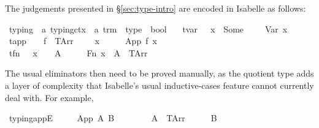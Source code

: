 The judgements presented in \S\ref{sec:type-intro} are encoded in Isabelle as follows:

\begin{implementation}
\isamarkupfalse%
\ typing\ {\isacharcolon}{\isacharcolon}\ {\isachardoublequoteopen}{\isacharprime}a\ typing{\isacharunderscore}ctx\ {\isasymRightarrow}\ {\isacharprime}a\ trm\ {\isasymRightarrow}\ type\ {\isasymRightarrow}\ bool{\isachardoublequoteclose}\  \isanewline
\ \ tvar{\isacharcolon}\ \ {\isachardoublequoteopen}{\isasymGamma}\ x\ {\isacharequal}\ Some\ {\isasymtau}\ {\isasymLongrightarrow}\ {\isasymGamma}\ {\isasymturnstile}\ Var\ x\ {\isacharcolon}\ {\isasymtau}{\isachardoublequoteclose}\isanewline
{\isacharbar}\ tapp{\isacharcolon}\ \ {\isachardoublequoteopen}{\isasymlbrakk}{\isasymGamma}\ {\isasymturnstile}\ f\ {\isacharcolon}\ {\isacharparenleft}TArr\ {\isasymtau}\ {\isasymsigma}{\isacharparenright}{\isacharsemicolon}\ {\isasymGamma}\ {\isasymturnstile}\ x\ {\isacharcolon}\ {\isasymtau}{\isasymrbrakk}\ {\isasymLongrightarrow}\ {\isasymGamma}\ {\isasymturnstile}\ App\ f\ x\ {\isacharcolon}\ {\isasymsigma}{\isachardoublequoteclose}\isanewline
{\isacharbar}\ tfn{\isacharcolon}\ \ \ {\isachardoublequoteopen}{\isasymGamma}{\isacharparenleft}x\ {\isasymmapsto}\ {\isasymtau}{\isacharparenright}\ {\isasymturnstile}\ A\ {\isacharcolon}\ {\isasymsigma}\ {\isasymLongrightarrow}\ {\isasymGamma}\ {\isasymturnstile}\ Fn\ x\ {\isasymtau}\ A\ {\isacharcolon}\ {\isacharparenleft}TArr\ {\isasymtau}\ {\isasymsigma}{\isacharparenright}{\isachardoublequoteclose}\isanewline
\end{implementation}

The usual eliminators then need to be proved manually, as the quotient type adds a layer of complexity that Isabelle's usual inductive-cases feature cannot currently deal with.
For example,

\begin{implementation}
\isamarkupfalse%
\ typing{\isacharunderscore}appE{\isacharcolon}\isanewline
\ \ \ {\isachardoublequoteopen}{\isasymGamma}\ {\isasymturnstile}\ App\ A\ B\ {\isacharcolon}\ {\isasymsigma}{\isachardoublequoteclose}\isanewline
\ \ \ {\isachardoublequoteopen}{\isasymexists}{\isasymtau}{\isachardot}\ {\isacharparenleft}{\isasymGamma}\ {\isasymturnstile}\ A\ {\isacharcolon}\ {\isacharparenleft}TArr\ {\isasymtau}\ {\isasymsigma}{\isacharparenright}{\isacharparenright}\ {\isasymand}\ {\isacharparenleft}{\isasymGamma}\ {\isasymturnstile}\ B\ {\isacharcolon}\ {\isasymtau}{\isacharparenright}{\isachardoublequoteclose}\isanewline
\end{implementation}

